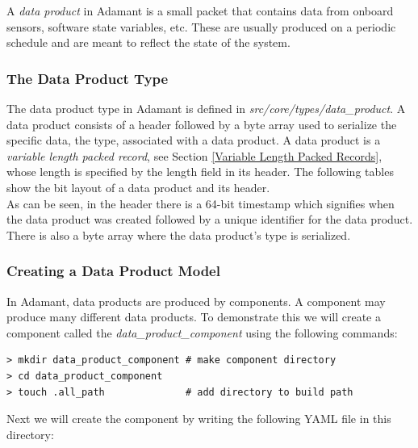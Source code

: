 A \textit{data product} in Adamant is a small packet that contains data from onboard sensors, software state variables, etc. These are usually produced on a periodic schedule and are meant to reflect the state of the system.

\subsubsection{The Data Product Type} \label{The Data Product Type}

The data product type in Adamant is defined in \textit{src/core/types/data\_product}. A data product consists of a header followed by a byte array used to serialize the specific data, the type, associated with a data product. A data product is a \textit{variable length packed record}, see Section \ref{Variable Length Packed Records}, whose length is specified by the length field in its header. The following tables show the bit layout of a data product and its header. \\




As can be seen, in the header there is a 64-bit timestamp which signifies when the data product was created followed by a unique identifier for the data product. There is also a byte array where the data product's type is serialized. \\

\subsubsection{Creating a Data Product Model}

In Adamant, data products are produced by components. A component may produce many different data products. To demonstrate this we will create a component called the \textit{data\_product\_component} using the following commands:

\vspace{5mm} %
\begin{verbatim}
> mkdir data_product_component # make component directory
> cd data_product_component 
> touch .all_path              # add directory to build path
\end{verbatim}
\vspace{5mm} %

Next we will create the component by writing the following YAML file in this directory: \\

